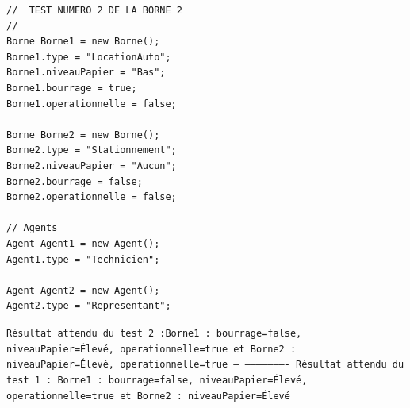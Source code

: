 \documentclass[11pt,a4paper]{article}
\begin{document}
\vspace{70em}
\begin{lstlisting}[language=ILR,basicstyle=\ttfamily\small,frame=single]
//  TEST NUMERO 2 DE LA BORNE 2
//
Borne Borne1 = new Borne();
Borne1.type = "LocationAuto";
Borne1.niveauPapier = "Bas";
Borne1.bourrage = true;
Borne1.operationnelle = false;

Borne Borne2 = new Borne();
Borne2.type = "Stationnement";
Borne2.niveauPapier = "Aucun";
Borne2.bourrage = false;
Borne2.operationnelle = false;

// Agents
Agent Agent1 = new Agent();
Agent1.type = "Technicien";

Agent Agent2 = new Agent();
Agent2.type = "Representant";
\end{lstlisting}
\texttt{Résultat attendu du test 2 :Borne1 : bourrage=false, niveauPapier=Élevé, operationnelle=true et Borne2 : niveauPapier=Élevé, operationnelle=true --
----------------------  Résultat attendu du test 1 : Borne1 : bourrage=false, niveauPapier=Élevé, operationnelle=true et Borne2 : niveauPapier=Élevé}
\end{document}
